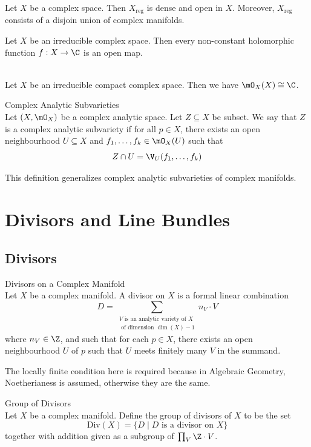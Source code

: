 \documentclass[a4paper]{article}
\begin{document}
\begin{thm}{}{} Let $X$ be a complex space. Then $X_\text{reg}$ is dense and open in $X$. Moreover, $X_\text{reg}$ consists of a disjoin union of complex manifolds. 
\end{thm}

\begin{thm}{}{} Let $X$ be an irreducible complex space. Then every non-constant holomorphic function $f:X\to\C$ is an open map. 
\end{thm}

\begin{crl}{}{}\\
Let $X$ be an irreducible compact complex space. Then we have $\mO_X(X)\cong\C$. 
\end{crl}

\begin{defn}{Complex Analytic Subvarieties}{}\\
Let $(X,\mO_X)$ be a complex analytic space. Let $Z\subseteq X$ be subset. We say that $Z$ is a complex analytic subvariety if for all $p\in X$, there exists an open neighbourhood $U\subseteq X$ and $f_1,\dots,f_k\in\mO_X(U)$ such that $$Z\cap U=\V_U(f_1,\dots,f_k)$$
\end{defn}

This definition generalizes complex analytic subvarieties of complex manifolds. 

\pagebreak
\section{Divisors and Line Bundles}
\subsection{Divisors}
\begin{defn}{Divisors on a Complex Manifold}{}\\
Let $X$ be a complex manifold. A divisor on $X$ is a formal linear combination $$D=\sum_{\substack{V\text{ is an analytic variety of }X\\\text{ of dimension }\dim(X)-1}}n_V\cdot V$$ where $n_V\in\Z$, and such that for each $p\in X$, there exists an open neighbourhood $U$ of $p$ such that $U$ meets finitely many $V$ in the summand. 
\end{defn}

The locally finite condition here is required because in Algebraic Geometry, Noetherianess is assumed, otherwise they are the same. 

\begin{defn}{Group of Divisors}{}\\
Let $X$ be a complex manifold. Define the group of divisors of $X$ to be the set $$\text{Div}(X)=\{D\;|\;D\text{ is a divisor on }X\}$$ together with addition given as a subgroup of $\prod_V\Z\cdot V$. 
\end{defn}
\end{document}
